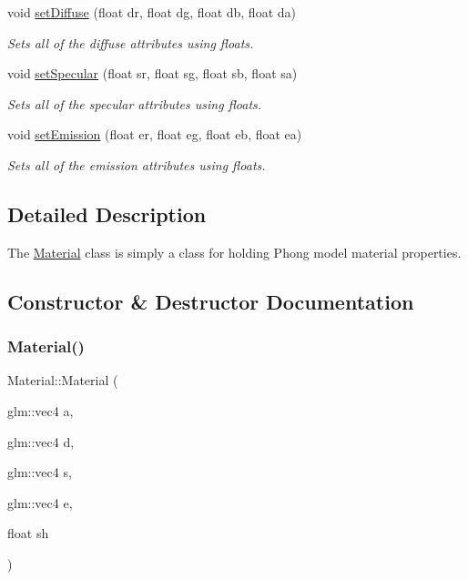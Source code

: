 \begin{DoxyCompactItemize}
void \hyperlink{class_material_aff3b4318d5fe7e4072a586f7d30d7f32}{set\+Diffuse} (float dr, float dg, float db, float da)
\begin{DoxyCompactList}\small\item\em Sets all of the diffuse attributes using floats. \end{DoxyCompactList}\item 
void \hyperlink{class_material_a9767d6b00b8d49174629baed01b7e3cf}{set\+Specular} (float sr, float sg, float sb, float sa)
\begin{DoxyCompactList}\small\item\em Sets all of the specular attributes using floats. \end{DoxyCompactList}\item 
void \hyperlink{class_material_ab74b07e791097ac543577b178a673b49}{set\+Emission} (float er, float eg, float eb, float ea)
\begin{DoxyCompactList}\small\item\em Sets all of the emission attributes using floats. \end{DoxyCompactList}\end{DoxyCompactItemize}


\subsection{Detailed Description}
The \hyperlink{class_material}{Material} class is simply a class for holding Phong model material properties. 

\subsection{Constructor \& Destructor Documentation}
\mbox{\label{class_material_aa08d070b8078bc0e4c8074335005c527}} 
\subsubsection{\texorpdfstring{Material()}{Material()}\hspace{0.1cm}{\footnotesize\ttfamily [1/2]}}
{\footnotesize\ttfamily Material\+::\+Material (\begin{DoxyParamCaption}\item[{glm\+::vec4}]{a,  }\item[{glm\+::vec4}]{d,  }\item[{glm\+::vec4}]{s,  }\item[{glm\+::vec4}]{e,  }\item[{float}]{sh }\end{DoxyParamCaption})}



